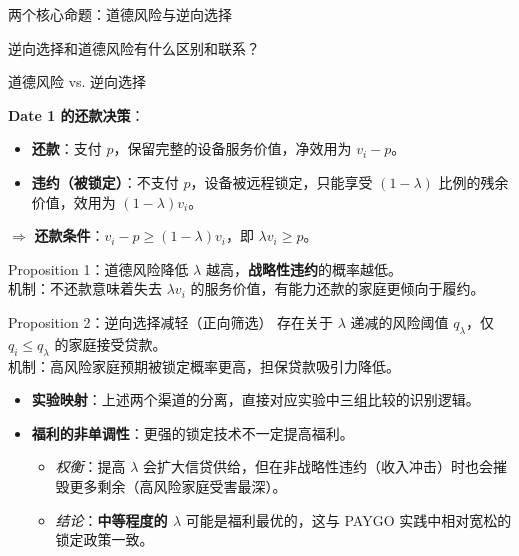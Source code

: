 \begin{frame}[allowframebreaks]{两个核心命题：道德风险与逆向选择}

    \begin{questionblock}
      逆向选择和道德风险有什么区别和联系？
    \end{questionblock}

    \begin{block}{道德风险 vs. 逆向选择}
       
    \end{block}
    
    \newpage

    \textbf{Date 1 的还款决策}：
    \begin{itemize}
        \item \textbf{还款}：支付 $p$，保留完整的设备服务价值，净效用为 $v_i - p$。
        \item \textbf{违约（被锁定）}：不支付 $p$，设备被远程锁定，只能享受 $(1-\lambda)$ 比例的残余价值，效用为 $(1-\lambda)v_i$。
    \end{itemize}
    $\Rightarrow$ \textbf{还款条件}：$v_i - p \geq (1-\lambda)v_i$，即 $\lambda v_i \geq p$。
    
    \vspace{0.5em}
    
    \begin{block}{Proposition 1：道德风险降低}
        $\lambda$ 越高，\textbf{战略性违约}的概率越低。\\
        \small{机制：不还款意味着失去 $\lambda v_i$ 的服务价值，有能力还款的家庭更倾向于履约。}
    \end{block}
    
    \begin{block}{Proposition 2：逆向选择减轻（正向筛选）}
        存在关于 $\lambda$ 递减的风险阈值 $q_\lambda$，仅 $q_i \leq q_\lambda$ 的家庭接受贷款。\\
        \small{机制：高风险家庭预期被锁定概率更高，担保贷款吸引力降低。}
    \end{block}
    
    \vspace{0.5em}
    
    \begin{itemize}
        \setlength{\itemsep}{4pt}
        \item \textbf{实验映射}：上述两个渠道的分离，直接对应实验中三组比较的识别逻辑。
        \item \textbf{福利的非单调性}：更强的锁定技术不一定提高福利。
        \begin{itemize}
            \item \textit{权衡}：提高 $\lambda$ 会扩大信贷供给，但在非战略性违约（收入冲击）时也会摧毁更多剩余（高风险家庭受害最深）。
            \item \textit{结论}：\textbf{中等程度的 $\lambda$} 可能是福利最优的，这与 PAYGO 实践中相对宽松的锁定政策一致。
        \end{itemize}
    \end{itemize}


    
\end{frame}


